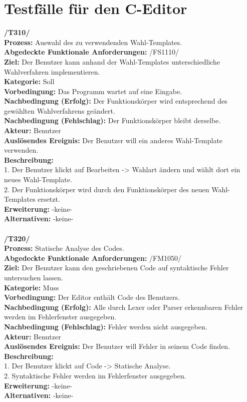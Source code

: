 \documentclass[a4paper]{scrreprt}
\begin{document}
\section{Testfälle für den C-Editor}
\textbf{/T310/} \\
\textbf{Prozess:} Auswahl des zu verwendenden Wahl-Templates. \\
\textbf{Abgedeckte Funktionale Anforderungen:} /FS1110/ \\
\textbf{Ziel:} Der Benutzer kann anhand der Wahl-Templates unterschiedliche Wahlverfahren implementieren. \\
\textbf{Kategorie:} Soll \\
\textbf{Vorbedingung:} Das Programm wartet auf eine Eingabe.\\
\textbf{Nachbedingung (Erfolg):} Der Funktionskörper wird entsprechend des gewählten Wahlverfahrens geändert. \\
\textbf{Nachbedingung (Fehlschlag):} Der Funktionskörper bleibt derselbe. \\
\textbf{Akteur:} Benutzer \\
\textbf{Auslösendes Ereignis:} Der Benutzer will ein anderes Wahl-Template verwenden. \\
\textbf{Beschreibung:} \\
1. Der Benutzer klickt auf Bearbeiten -> Wahlart ändern und wählt dort ein neues Wahl-Template. \\
2. Der Funktionskörper wird durch den Funktionskörper des neuen Wahl-Templates ersetzt. \\
\textbf {Erweiterung:} -keine- \\
\textbf {Alternativen:} -keine- \\
\\
\textbf{/T320/} \\
\textbf{Prozess:} Statische Analyse des Codes. \\
\textbf{Abgedeckte Funktionale Anforderungen:} /FM1050/ \\
\textbf{Ziel:} Der Benutzer kann den geschriebenen Code auf syntaktische Fehler untersuchen lassen. \\
\textbf{Kategorie:} Muss \\
\textbf{Vorbedingung:} Der Editor enthält Code des Benutzers. \\
\textbf{Nachbedingung (Erfolg):} Alle durch Lexer oder Parser erkennbaren Fehler werden im Fehlerfenster ausgegeben. \\
\textbf{Nachbedingung (Fehlschlag):} Fehler werden nicht ausgegeben. \\
\textbf{Akteur:} Benutzer \\
\textbf{Auslösendes Ereignis:} Der Benutzer will Fehler in seinem Code finden. \\
\textbf{Beschreibung:} \\
1. Der Benutzer klickt auf Code -> Statische Analyse. \\
2. Syntaktische Fehler werden im Fehlerfenster ausgegeben. \\
\textbf {Erweiterung:} -keine- \\
\textbf {Alternativen:} -keine- \\
\end{document}
